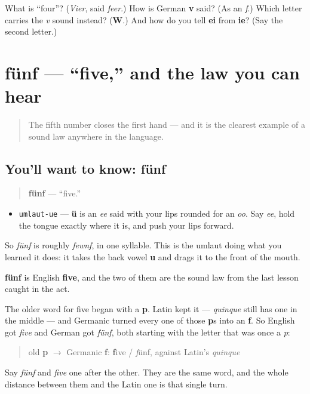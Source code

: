\begin{tcolorbox}[breakable,colback=teal!4,colframe=teal!35!black,title={Before you move on}]
What is \textquotedblleft{}four\textquotedblright{}? (\emph{Vier}, said \emph{feer}.) How is German \textbf{v} said? (As an \emph{f}.) Which letter carries the \emph{v} sound instead? (\textbf{W}.) And how do you tell \textbf{ei} from \textbf{ie}? (Say the second letter.)
\end{tcolorbox}
\section[fünf]{fünf — \textquotedblleft{}five,\textquotedblright{} and the law you can hear}

\label{lesson:GE-C06-fuenf}



\begin{quote}
The fifth number closes the first hand — and it is the clearest example of a sound law anywhere in the language.
\end{quote}

\subsection*{You'll want to know: fünf}
\begin{quote}
\textbf{fünf} — \textquotedblleft{}five.\textquotedblright{}
\end{quote}

\begin{sounds}
\begin{itemize}
\raggedright
  \item \texttt{umlaut-ue} — \textbf{ü} is an \emph{ee} said with your lips rounded for an \emph{oo}. Say \emph{ee}, hold the tongue exactly where it is, and push your lips forward.
\end{itemize}

So \emph{fünf} is roughly \emph{fewnf}, in one syllable. This is the umlaut doing what you learned it does: it takes the back vowel \textbf{u} and drags it to the front of the mouth.
\end{sounds}

\begin{cousinweb}
\textbf{fünf} is English \textbf{five}, and the two of them are the sound law from the last lesson caught in the act.

The older word for five began with a \textbf{p}. Latin kept it — \emph{quinque} still has one in the middle — and Germanic turned every one of those \textbf{p}s into an \textbf{f}. So English got \emph{five} and German got \emph{fünf}, both starting with the letter that was once a \emph{p}:

\begin{quote}
old \textbf{p} $\to$ Germanic \textbf{f}: \textbf{f}ive / \emph{f}ünf, against Latin's \emph{quinque}
\end{quote}

Say \emph{fünf} and \emph{five} one after the other. They are the same word, and the whole distance between them and the Latin one is that single turn.
\end{cousinweb}

